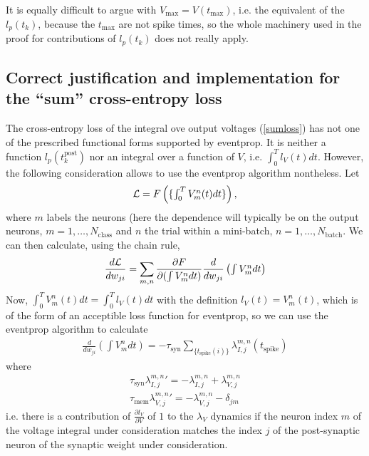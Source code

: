 \documentclass[a4paper]{article}
\begin{document}
 It is equally difficult to argue with
  $V_{\text{max}} = V(t_{\text{max}})$, i.e. the equivalent of the $l_p(t_k)$, because the $t_{\text{max}}$ are not
  spike times, so the whole machinery used in the proof for
  contributions of $l_p(t_k)$ does not really apply.

  \subsection{Correct justification and implementation for the ``sum'' cross-entropy loss}
  The cross-entropy loss of the integral ove output voltages (\ref{sumloss}) has not one of the prescribed functional forms supported by eventprop. It is neither a function $l_p(t_k^{\text{post}})$ nor an integral over a function of $V$, i.e. $\int_0^T l_V(t) dt$. However, the following consideration allows to use the eventprop algorithm nontheless.
  Let
  \begin{align}
    {\cal L} = F\left(\{\textstyle \int_0^T V_m^n(t) dt\}\right), \label{eqn:loss_gen}
  \end{align}
  where $m$ labels the neurons (here the dependence will typically be on the output neurons, $m= 1, \ldots, N_{\text{class}}$ and $n$ the trial within a mini-batch, $n= 1, \ldots, N_{\text{batch}}$. We can then calculate, using the chain rule,
  \begin{align}
    \frac{d{\cal L}}{d w_{ji}} = \sum_{m,n} \frac{\partial F}{\partial (\int V_m^n dt)} \frac{d}{d w_{ji}} \left(\textstyle\int V_m^n dt\right)
  \end{align}
  Now, $\int_0^T V_m^n(t) dt = \int_0^T l_V(t) dt$ with the definition $l_V(t)= V_m^n(t)$, which is of the form of an acceptible loss function for eventprop, so we can use the eventprop algorithm to calculate
  \begin{align}
    \frac{d}{d w_{ji}} (\int V_m^n dt) = -\tau_{\text{syn}} \sum_{\{t_{\text{spike}}(i)\}} \lambda_{I,j}^{m,n}(t_{\text{spike}})
  \end{align}
  where
  \begin{align}
    \tau_{\text{syn}} {\lambda_{I,j}^{m,n}}' = -\lambda_{I,j}^{m,n} + \lambda_{V,j}^{m,n} \\
    \tau_{\text{mem}} {\lambda_{V,j}^{m,n}}' = -\lambda_{V,j}^{m,n} - \delta_{jm}
  \end{align}
  i.e. there is a contribution of $\frac{\partial l_V}{\partial V}$ of $1$ to the $\lambda_V$ dynamics if the neuron index $m$ of the voltage integral under consideration matches the index $j$ of the post-synaptic neuron of the synaptic weight under consideration.
\end{document}
